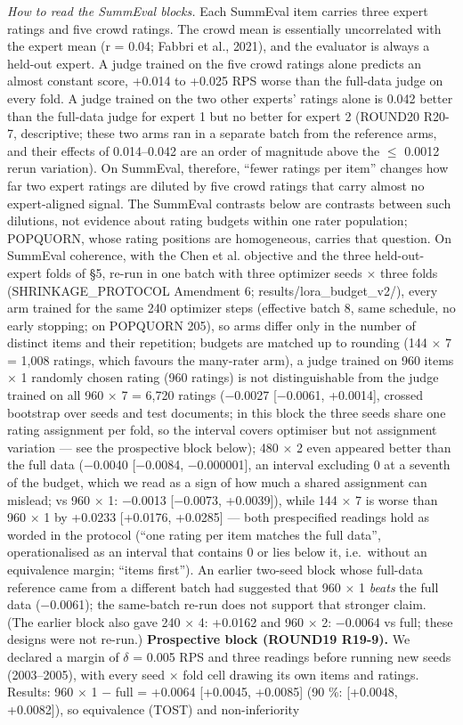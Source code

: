 \documentclass[10pt,twocolumn]{article}
\begin{document}
\emph{How to read the SummEval blocks.} Each SummEval item carries three expert ratings and five crowd ratings. The crowd mean is essentially uncorrelated with the expert mean (r = 0.04; Fabbri et al., 2021), and the evaluator is always a held-out expert. A judge trained on the five crowd ratings alone predicts an almost constant score, +0.014 to +0.025 RPS worse than the full-data judge on every fold. A judge trained on the two other experts' ratings alone is 0.042 better than the full-data judge for expert 1 but no better for expert 2 (ROUND20 R20-7, descriptive; these two arms ran in a separate batch from the reference arms, and their effects of 0.014--0.042 are an order of magnitude above the $\leq$ 0.0012 rerun variation). On SummEval, therefore, ``fewer ratings per item'' changes how far two expert ratings are diluted by five crowd ratings that carry almost no expert-aligned signal. The SummEval contrasts below are contrasts between such dilutions, not evidence about rating budgets within one rater population; POPQUORN, whose rating positions are homogeneous, carries that question. On SummEval coherence, with the Chen et al. objective and the three held-out-expert folds of \S{}5, re-run in one batch with three optimizer seeds $\times$ three folds (SHRINKAGE\_PROTOCOL Amendment 6; results/lora\_budget\_v2/), every arm trained for the same 240 optimizer steps (effective batch 8, same schedule, no early stopping; on POPQUORN 205), so arms differ only in the number of distinct items and their repetition; budgets are matched up to rounding (144 $\times$ 7 = 1,008 ratings, which favours the many-rater arm), a judge trained on 960 items $\times$ 1 randomly chosen rating (960 ratings) is not distinguishable from the judge trained on all 960 $\times$ 7 = 6,720 ratings ($-$0.0027 {[}$-$0.0061, +0.0014{]}, crossed bootstrap over seeds and test documents; in this block the three seeds share one rating assignment per fold, so the interval covers optimiser but not assignment variation --- see the prospective block below); 480 $\times$ 2 even appeared better than the full data ($-$0.0040 {[}$-$0.0084, $-$0.000001{]}, an interval excluding 0 at a seventh of the budget, which we read as a sign of how much a shared assignment can mislead; vs 960 $\times$ 1: $-$0.0013 {[}$-$0.0073, +0.0039{]}), while 144 $\times$ 7 is worse than 960 $\times$ 1 by +0.0233 {[}+0.0176, +0.0285{]} --- both prespecified readings hold as worded in the protocol (``one rating per item matches the full data'', operationalised as an interval that contains 0 or lies below it, i.e.~without an equivalence margin; ``items first''). An earlier two-seed block whose full-data reference came from a different batch had suggested that 960 $\times$ 1 \emph{beats} the full data ($-$0.0061); the same-batch re-run does not support that stronger claim. (The earlier block also gave 240 $\times$ 4: +0.0162 and 960 $\times$ 2: $-$0.0064 vs full; these designs were not re-run.) \textbf{Prospective block (ROUND19 R19-9).} We declared a margin of $\delta$ = 0.005 RPS and three readings before running new seeds (2003--2005), with every seed $\times$ fold cell drawing its own items and ratings. Results: 960 $\times$ 1 $-$ full = +0.0064 {[}+0.0045, +0.0085{]} (90 \%: {[}+0.0048, +0.0082{]}), so equivalence (TOST) and non-inferiority 
\end{document}
